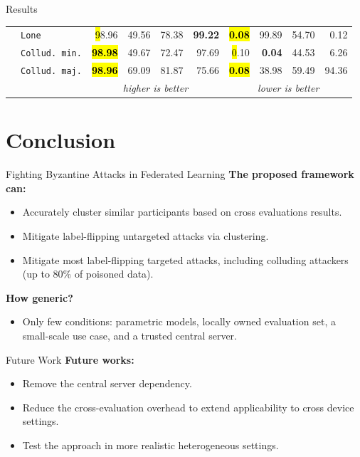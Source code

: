 \documentclass[aspectratio=169,10pt]{imta}
\begin{document}
\begin{frame}{Results}
\begin{table}
\begin{tabularx}{.8\textwidth}{lX|rrrr|rrrr}
      & \texttt{Lone}          & \hl 98.96 & 49.56 & 78.38 & \textbf{99.22} &\hl \textbf{0.08} & 99.89 & 54.70 & 0.12 \\
      & \texttt{Collud. min.}  & \hl \textbf{98.98} & 49.67 & 72.47 & 97.69 & \hl 0.10 & \textbf{0.04} & 44.53 & 6.26 \\
      & \texttt{Collud. maj.}  & \hl \textbf{98.96} & 69.09 & 81.87 & 75.66 & \hl \textbf{0.08} & 38.98 & 59.49 & 94.36 \\          
      \bottomrule %
      \small & \multicolumn{1}{c}{} & \multicolumn{4}{c}{\emph{higher is better}} & \multicolumn{4}{c}{\emph{lower is better}}
    \end{tabularx}
  \end{table}
  
\end{frame}



\section*{Conclusion}

\begin{frame}
  \sectionpage
\end{frame}

\begin{frame}{Fighting Byzantine Attacks in Federated Learning}
  \textbf{The proposed framework can:}
  \begin{itemize}
    \item Accurately cluster similar participants based on cross evaluations results.
    \item Mitigate label-flipping untargeted attacks via clustering.
    \item Mitigate most label-flipping targeted attacks, including colluding attackers (up to 80\% of poisoned data).
  \end{itemize}

  \pause
  \textbf{How generic?}
  \begin{itemize}
    \item Only few conditions: parametric models, locally owned evaluation set, a \alert<3>{small-scale use case}, and a \alert<3>{trusted central server}.
  \end{itemize}
\end{frame}


\begin{frame}{Future Work}
  \textbf{Future works:}
    \begin{itemize}
      \item Remove the central server dependency.
      \item Reduce the cross-evaluation overhead to extend applicability to cross device settings.
      \item Test the approach in more realistic heterogeneous settings.
    \end{itemize}
\end{frame}
\end{document}
